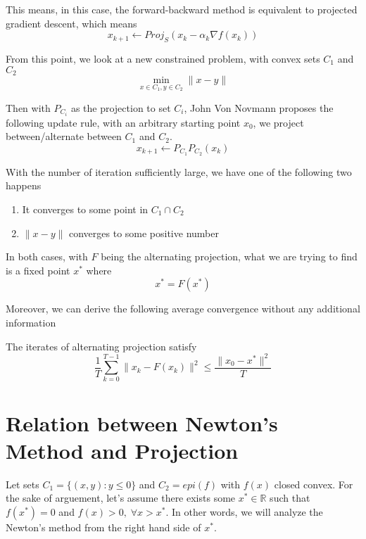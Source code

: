 This means, in this case, the forward-backward method is equivalent to projected gradient descent, which means
\begin{equation*}
    x_{k+1} \leftarrow Proj_S(x_k - \alpha_k \nabla f(x_k))
\end{equation*}

From this point, we look at a new constrained problem, with convex sets $C_1$ and $C_2$ 
\begin{equation*}
    \min_{x \in C_1, y \in C_2} \| x - y \|
\end{equation*}

Then with $P_{C_i}$ as the projection to set $C_i$, John Von Novmann proposes the following update rule, with an arbitrary starting point $x_0$, we project between/alternate between $C_1$ and $C_2$.
\begin{equation*}
    x_{k+1} \leftarrow P_{C_1}P_{C_2}(x_k)
\end{equation*}

With the number of iteration sufficiently large, we have one of the following two happens
\begin{enumerate}
    \item It converges to some point in $C_1 \cap C_2$
    \item $\|x - y\|$ converges to some positive number
\end{enumerate}
In both cases, with $F$ being the alternating projection, what we are trying to find is a fixed point $x^*$ where 
\begin{equation*}
    x^* = F(x^*)
\end{equation*}

Moreover, we can derive the following average convergence without any additional information
\begin{theorem}
    The iterates of alternating projection satisfy
    \begin{equation*}
        \frac{1}{T}\sum_{k=0}^{T-1}\|x_k - F(x_k)\|^2 \leq \frac{\|x_0 - x^*\|^2}{T}
    \end{equation*}
\end{theorem}

\section{Relation between Newton's Method and Projection}
Let sets $C_1 = \{ (x, y) : y \leq 0\}$ and $C_2 = epi(f)$ with $f(x)$ closed convex. For the sake of arguement, let's assume there exists some $x^* \in \mathbb{R}$ such that $f(x^*) = 0$ and $f(x) > 0, \; \forall x > x^*$. In other words, we will analyze the Newton's method from the right hand side of $x^*$.

